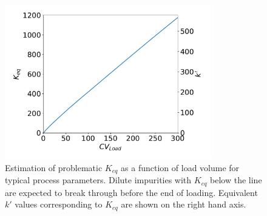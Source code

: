 \documentclass[11pt,a4paper]{article}
\begin{document}
\begin{figure}[bp]
            \centering
            \includegraphics[width=0.8\textwidth]{problematic_Keq}
            \caption{Estimation of problematic $K_{eq}$ as a function of load volume for typical process parameters. Dilute impurities with $K_{eq}$ below the line are expected to break through before the end of loading. Equivalent $k'$ values corresponding to $K_{eq}$ are shown on the right hand axis.}
            \label{fig:problematic Keq}
\end{figure}
\end{document}
